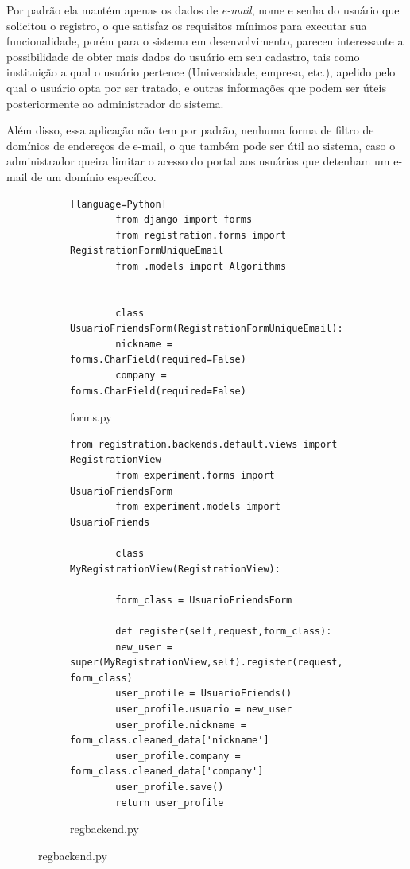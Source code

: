 \documentclass[tg]{mdtufsm}
\begin{document}
Por padrão ela mantém apenas os dados de \emph{e-mail}, nome e senha do usuário que solicitou o registro, o que satisfaz os requisitos mínimos para executar sua funcionalidade, porém para o sistema em desenvolvimento, pareceu interessante a possibilidade de obter mais dados do usuário em seu cadastro, tais como instituição a qual o usuário pertence (Universidade, empresa, etc.), apelido pelo qual o usuário opta por ser tratado, e outras informações que podem ser úteis posteriormente ao administrador do sistema.

Além disso, essa aplicação não tem por padrão, nenhuma forma de filtro de domínios de endereços de e-mail, o que também pode ser útil ao sistema, caso o administrador queira limitar o acesso do portal aos usuários que detenham um e-mail de um domínio específico.
\begin{figure}
	\centering
	\begin{subfigure}[c]{0.6\textwidth}
		\begin{lstlisting}[frame=single][language=Python]
		from django import forms
		from registration.forms import RegistrationFormUniqueEmail
		from .models import Algorithms
		
		
		class UsuarioFriendsForm(RegistrationFormUniqueEmail):
		nickname = forms.CharField(required=False)
		company = forms.CharField(required=False)
		\end{lstlisting}
		
		\caption{forms.py}
		\label{fig:formRegister}
	\end{subfigure}
	
	\begin{subfigure}[c]{0.6\textwidth}
		\begin{lstlisting}[numbers=none, breaklines=true]
		from registration.backends.default.views import RegistrationView
		from experiment.forms import UsuarioFriendsForm
		from experiment.models import UsuarioFriends
		
		class MyRegistrationView(RegistrationView):
		
		form_class = UsuarioFriendsForm
		
		def register(self,request,form_class):
		new_user = super(MyRegistrationView,self).register(request, form_class)
		user_profile = UsuarioFriends()
		user_profile.usuario = new_user
		user_profile.nickname = form_class.cleaned_data['nickname']
		user_profile.company = form_class.cleaned_data['company']
		user_profile.save()
		return user_profile
		\end{lstlisting}
		
		\caption{regbackend.py}
		\label{fig:view}
	\end{subfigure}
\end{figure}
\end{document}
